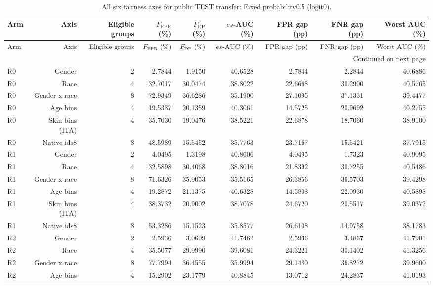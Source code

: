 \documentclass[10pt]{article}
\begin{document}
\begin{longtable}{@{}lrrrrrrrr@{}}
\caption{All six fairness axes for public TEST transfer: Fixed probability0.5 (logit0).}\\
\toprule
Arm & Axis & Eligible groups & $F_{\mathrm{FPR}}$ (\%) & $F_{\mathrm{DP}}$ (\%) & $es$-AUC (\%) & FPR gap (pp) & FNR gap (pp) & Worst AUC (\%) \\
\midrule
\endfirsthead
\toprule
Arm & Axis & Eligible groups & $F_{\mathrm{FPR}}$ (\%) & $F_{\mathrm{DP}}$ (\%) & $es$-AUC (\%) & FPR gap (pp) & FNR gap (pp) & Worst AUC (\%) \\
\midrule
\endhead
\midrule
\multicolumn{9}{r}{Continued on next page}\\
\endfoot
\bottomrule
\endlastfoot
R0 & Gender & 2 & 2.7844 & 1.9150 & 40.6528 & 2.7844 & 2.2844 & 40.6886 \\
R0 & Race & 4 & 32.7017 & 30.0474 & 38.8022 & 22.6668 & 30.2900 & 40.5765 \\
R0 & Gender x race & 8 & 72.9349 & 36.6286 & 35.1900 & 27.1095 & 37.1331 & 39.4477 \\
R0 & Age bins & 4 & 19.5337 & 20.1359 & 40.3061 & 14.5725 & 20.9692 & 40.2755 \\
R0 & Skin bins (ITA) & 4 & 35.7030 & 19.0476 & 38.5221 & 22.6878 & 18.7060 & 38.9100 \\
R0 & Native ids8 & 8 & 48.5989 & 15.5452 & 35.7763 & 23.7167 & 15.5421 & 37.7915 \\
R1 & Gender & 2 & 4.0495 & 1.3198 & 40.8606 & 4.0495 & 1.7323 & 40.9095 \\
R1 & Race & 4 & 32.5898 & 30.4068 & 38.8016 & 21.8392 & 30.7255 & 40.5486 \\
R1 & Gender x race & 8 & 71.6326 & 35.9053 & 35.5165 & 26.3856 & 36.5703 & 39.4298 \\
R1 & Age bins & 4 & 19.2872 & 21.1375 & 40.6328 & 14.5808 & 22.0930 & 40.5898 \\
R1 & Skin bins (ITA) & 4 & 38.3732 & 20.9002 & 38.7078 & 24.6720 & 20.5517 & 39.0372 \\
R1 & Native ids8 & 8 & 53.3286 & 15.1523 & 35.8577 & 26.6108 & 14.9758 & 38.1783 \\
R2 & Gender & 2 & 2.5936 & 3.0609 & 41.7462 & 2.5936 & 3.4867 & 41.7901 \\
R2 & Race & 4 & 35.5077 & 29.9990 & 39.6081 & 24.3221 & 30.1402 & 41.3256 \\
R2 & Gender x race & 8 & 77.7994 & 36.4555 & 35.9994 & 29.1480 & 36.8272 & 39.9600 \\
R2 & Age bins & 4 & 15.2902 & 23.1779 & 40.8845 & 13.0712 & 24.2837 & 41.0193 \\

\end{longtable}
\end{document}
